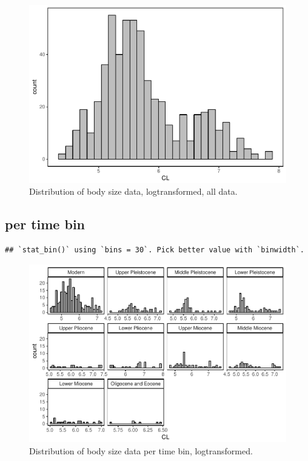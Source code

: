 \documentclass[]{article}
\begin{document}
\begin{figure}[htbp]
\centering
\includegraphics{MA_JJ_files/figure-latex/Histograms of body size data, all-1.pdf}
\caption{Distribution of body size data, logtransformed, all data.}
\end{figure}

\newpage

\subsection{per time bin}\label{per-time-bin}

\begin{verbatim}
## `stat_bin()` using `bins = 30`. Pick better value with `binwidth`.
\end{verbatim}

\begin{figure}[htbp]
\centering
\includegraphics{MA_JJ_files/figure-latex/Histograms of body size data, per time bin-1.pdf}
\caption{Distribution of body size data per time bin, logtransformed.}
\end{figure}
\end{document}
